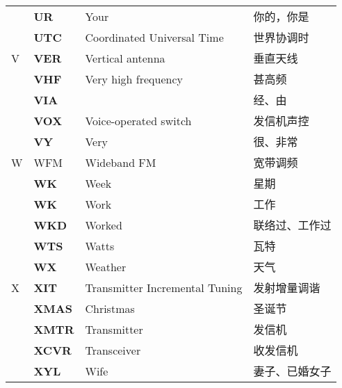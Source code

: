 \begin{longtable}[l]{llll}
    & \textbf{UR}                       & Your                                    & 你的，你是               \\
    & \textbf{UTC}                      & Coordinated Universal Time              & 世界协调时               \\%
  V & \textbf{VER}                      & Vertical antenna                        & 垂直天线                \\
    & \textbf{VHF}                      & Very high frequency                     & 甚高频                 \\
    & \textbf{VIA}                      &                                         & 经、由                 \\
    & \textbf{VOX}                      & Voice-operated switch                   & 发信机声控               \\
    & \textbf{VY}                       & Very                                    & 很、非常                \\
  W & WFM                               & Wideband FM                             & 宽带调频                \\
    & \textbf{WK}                       & Week                                    & 星期                  \\
    & \textbf{WK}                       & Work                                    & 工作                  \\
    & \textbf{WKD}                      & Worked                                  & 联络过、工作过             \\
    & \textbf{WTS}                      & Watts                                   & 瓦特                  \\
    & \textbf{WX}                       & Weather                                 & 天气                  \\
  X & \textbf{XIT}                      & Transmitter Incremental Tuning          & 发射增量调谐              \\
    & \textbf{XMAS}                     & Christmas                               & 圣诞节                 \\
    & \textbf{XMTR}                     & Transmitter                             & 发信机                 \\
    & \textbf{XCVR}                     & Transceiver                             & 收发信机                \\
    & \textbf{XYL}                      & Wife                                    & 妻子、已婚女子             \\

\end{longtable}

